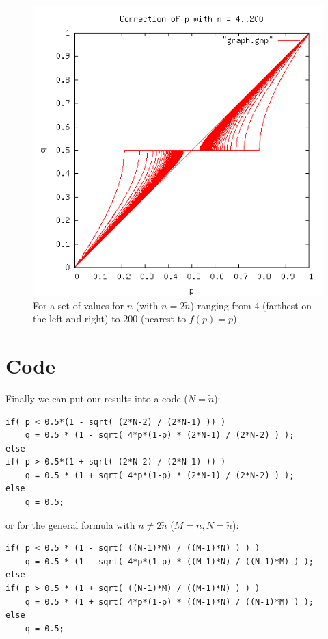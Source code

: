 \documentclass[a4paper,twoside]{report}
\begin{document}
\begin{figure}[h]
\includegraphics[scale=0.5]{graph.png}
\caption{
For a set of values for \(n\) (with \(n = 2\tilde{n}\)) ranging from \(4\) (farthest on the left and right) to \(200\) (nearest to \(f(p) = p\))}
\end{figure}

\newpage
\section{Code}
Finally we can put our results into a code (\(N = \tilde{n}\)):\\

\begin{verbatim}
if( p < 0.5*(1 - sqrt( (2*N-2) / (2*N-1) )) )
    q = 0.5 * (1 - sqrt( 4*p*(1-p) * (2*N-1) / (2*N-2) ) );
else
if( p > 0.5*(1 + sqrt( (2*N-2) / (2*N-1) )) )
    q = 0.5 * (1 + sqrt( 4*p*(1-p) * (2*N-1) / (2*N-2) ) );
else
    q = 0.5;
\end{verbatim}

or for the general formula with \(n \neq 2\tilde{n}\) (\(M = n, N = \tilde{n}\)):\\
         
\begin{verbatim}
if( p < 0.5 * (1 - sqrt( ((N-1)*M) / ((M-1)*N) ) ) )
    q = 0.5 * (1 - sqrt( 4*p*(1-p) * ((M-1)*N) / ((N-1)*M) ) );
else 
if( p > 0.5 * (1 + sqrt( ((N-1)*M) / ((M-1)*N) ) ) )
    q = 0.5 * (1 + sqrt( 4*p*(1-p) * ((M-1)*N) / ((N-1)*M) ) );
else
    q = 0.5;
\end{verbatim}
\end{document}
